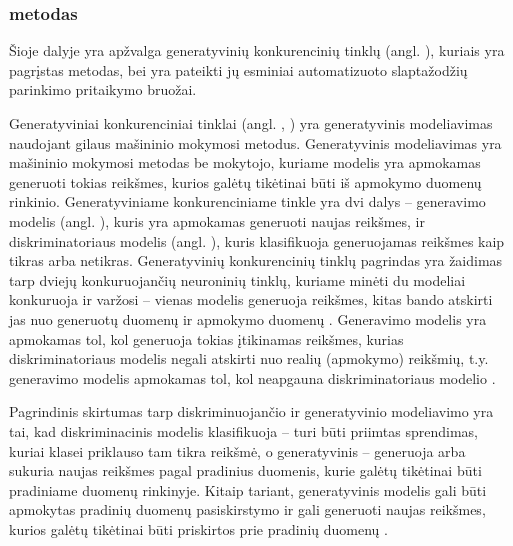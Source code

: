 \documentclass{VUMIFInfBakalaurinis}
\begin{document}
\subsubsection{ metodas}
Šioje dalyje yra apžvalga generatyvinių konkurencinių tinklų (angl. 
), kuriais yra pagrįstas 
 metodas, bei yra pateikti jų esminiai automatizuoto 
slaptažodžių parinkimo pritaikymo bruožai.

Generatyviniai konkurenciniai tinklai (angl. , ) yra generatyvinis modeliavimas naudojant gilaus 
mašininio mokymosi metodus. Generatyvinis modeliavimas yra mašininio mokymosi 
metodas be mokytojo, kuriame modelis yra apmokamas generuoti tokias reikšmes, 
kurios galėtų tikėtinai būti iš apmokymo duomenų rinkinio. Generatyviniame 
konkurenciniame tinkle yra dvi dalys -- generavimo modelis (angl. 
), kuris yra apmokamas generuoti naujas reikšmes, ir 
diskriminatoriaus modelis (angl. ), kuris 
klasifikuoja generuojamas reikšmes kaip tikras arba netikras. Generatyvinių 
konkurencinių tinklų pagrindas yra žaidimas tarp dviejų konkuruojančių 
neuroninių tinklų, kuriame minėti du modeliai konkuruoja ir varžosi -- vienas 
modelis generuoja reikšmes, kitas bando atskirti jas nuo generuotų duomenų ir 
apmokymo duomenų \cite{DL,GAN}. Generavimo modelis yra apmokamas tol, kol 
generuoja tokias įtikinamas reikšmes, kurias diskriminatoriaus modelis negali 
atskirti nuo realių (apmokymo) reikšmių, t.y. generavimo modelis apmokamas tol, 
kol neapgauna diskriminatoriaus modelio \cite{GAN}.

Pagrindinis skirtumas tarp diskriminuojančio ir generatyvinio modeliavimo yra 
tai, kad diskriminacinis modelis klasifikuoja -- turi būti priimtas sprendimas, 
kuriai klasei priklauso tam tikra reikšmė, o generatyvinis -- generuoja arba 
sukuria naujas reikšmes pagal pradinius duomenis, kurie galėtų tikėtinai būti 
pradiniame duomenų rinkinyje. Kitaip tariant, generatyvinis modelis gali būti 
apmokytas pradinių duomenų pasiskirstymo ir gali generuoti naujas reikšmes, 
kurios galėtų tikėtinai būti priskirtos prie pradinių duomenų \cite{PRaML}.
\end{document}
